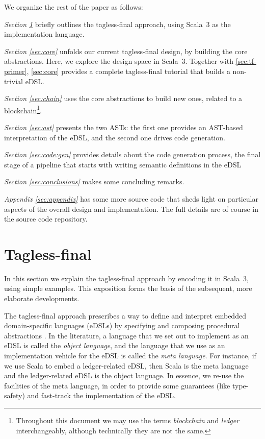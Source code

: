 \documentclass[11pt]{article}
\begin{document}
We organize the rest of the paper as follows:

\textit{Section \ref{sec:tf-primer}} briefly outlines the tagless-final 
approach, using Scala~3 as the implementation language.

\textit{Section \ref{sec:core}} unfolds our current tagless-final design, by 
building the core abstractions. Here, we explore the design space in Scala~3. 
Together with \autoref{sec:tf-primer}, \autoref{sec:core} provides a complete 
tagless-final tutorial that builds a non-trivial eDSL.

\textit{Section \ref{sec:chain}} uses the core abstractions to build new 
ones, related to a blockchain\footnote{Throughout this document we may use 
the terms \textit{blockchain} and \textit{ledger} interchangeably, although 
technically they are not the same.}.

\textit{Section \ref{sec:ast}} presents the two ASTs: the first one provides 
an AST-based interpretation of the eDSL, and the second one drives code 
generation.

\textit{Section \ref{sec:code:gen}} provides details about the code 
generation process, the final stage of a pipeline that starts with writing 
semantic definitions in the eDSL 

\textit{Section \ref{sec:conclusions} } makes some concluding remarks.

\textit{Appendix \ref{sec:appendix}} has some more source code that sheds 
light on particular aspects of the overall design and implementation. The 
full details are of course in the source code repository.

\section{Tagless-final}
\label{sec:tf-primer}
\begin{tcolorbox}
\faAngleDoubleRight{ } In this section we explain the tagless-final approach 
by encoding it in Scala~3, using simple examples. This exposition forms the 
basis of the subsequent, more elaborate developments.
\end{tcolorbox}

The tagless-final approach \cite{tf:main:2009,tf:lecture:2012} prescribes a 
way to define and interpret embedded domain-specific languages (eDSLs) by 
specifying and composing procedural abstractions 
\cite{data:abstraction:1978}. In the literature, a language that we set out 
to implement as an eDSL is called the \textit{object language}, and the 
language that we use as an implementation vehicle for the eDSL is called the 
\textit{meta language}. For instance, if we use Scala to embed a 
ledger-related eDSL, then Scala is the meta language and the ledger-related 
eDSL is the object language. In essence, we re-use the facilities of the meta 
language, in order to provide some guarantees (like type-safety) and 
fast-track the implementation of the eDSL.
\end{document}
